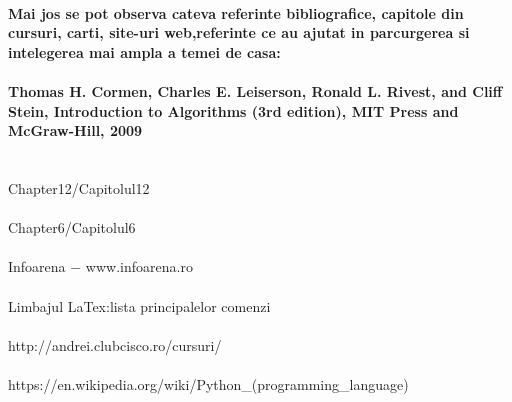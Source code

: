 \documentclass[12pt, a4paper,oneside]{article}
\begin{document}
\paragraph{Mai jos se pot observa cateva referinte bibliografice, capitole din cursuri, carti, site-uri web,referinte ce au ajutat in parcurgerea si intelegerea mai ampla a temei de casa: \\}
\begin{thebibliography}
  \paragraph{Thomas H. Cormen, Charles E. Leiserson, Ronald L.
Rivest, and Cliff Stein, Introduction to Algorithms (3rd
edition), MIT Press and McGraw-Hill, 2009\\\\}
{Chapter12/Capitolul12\\\\} 
{Chapter6/Capitolul6\\\\}
{Infoarena $ - $  www.infoarena.ro \\\\}
{Limbajul LaTex:lista principalelor comenzi\\\\} {http://andrei.clubcisco.ro/cursuri/\\\\}
{https://en.wikipedia.org/wiki/Python\_(programming\_language)}
\end{thebibliography}
\end{document}
